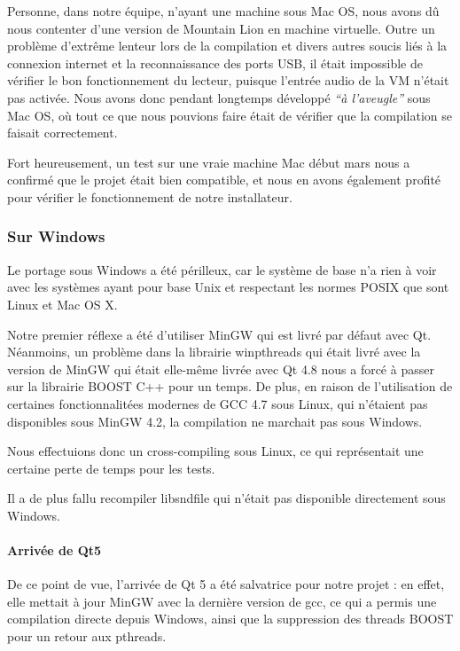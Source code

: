 \documentclass[a4paper,11pt]{article}
\begin{document}
Personne, dans notre équipe, n'ayant une machine sous Mac OS, nous avons dû nous contenter d'une version de Mountain Lion en machine virtuelle. Outre un problème d'extrême lenteur lors de la compilation et divers autres soucis liés à la connexion internet et la reconnaissance des ports USB, il était impossible de vérifier le bon fonctionnement du lecteur, puisque l'entrée audio de la VM n'était pas activée. Nous avons donc pendant longtemps développé \textit{``à l'aveugle''} sous Mac OS, où tout ce que nous pouvions faire était de vérifier que la compilation se faisait correctement.

Fort heureusement, un test sur une vraie machine Mac début mars nous a confirmé que le projet était bien compatible, et nous en avons également profité pour vérifier le fonctionnement de notre installateur.

\subsubsection*{Sur Windows}

Le portage sous Windows a été périlleux, car le système de base n'a rien à voir avec les systèmes ayant pour base Unix et respectant
les normes POSIX que sont Linux et Mac OS X.

Notre premier réflexe a été d'utiliser MinGW qui est livré par défaut avec Qt. Néanmoins, un problème
dans la librairie winpthreads qui était livré avec la version de MinGW qui était elle-même livrée avec Qt 4.8 nous a
forcé à passer sur la librairie BOOST C++ pour un temps. De plus, en raison de l'utilisation de certaines fonctionnalitées modernes
de GCC 4.7 sous Linux, qui n'étaient pas disponibles sous MinGW 4.2, la compilation ne marchait pas sous Windows.

Nous effectuions donc un cross-compiling sous Linux, ce qui représentait une certaine perte de temps pour les tests.

Il a de plus fallu recompiler libsndfile qui n'était pas disponible directement sous Windows.

\paragraph{Arrivée de Qt5}
De ce point de vue, l'arrivée de Qt 5 a été salvatrice pour notre projet : en effet, elle mettait à jour MinGW
avec la dernière version de gcc, ce qui a permis une compilation directe depuis Windows, ainsi que la suppression des
threads BOOST pour un retour aux pthreads.
\end{document}
